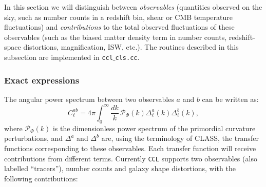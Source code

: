 \documentclass[\docopts]{\docclass}
\newcommand{\ccl}{{\tt CCL}\xspace}
\begin{document}
In this section we will distinguish between {\sl observables} (quantities observed on the sky, such as number counts in a redshift bin, shear or CMB temperature fluctuations) and {\sl contributions} to the total observed fluctuations of these observables (such as the biased matter density term in number counts, redshift-space distortions, magnification, ISW, etc.).
The routines described in this subsection are implemented in {\tt ccl$\_$cls.cc}.

\subsubsection{Exact expressions}
The angular power spectrum between two observables $a$ and $b$ can be written as:
\begin{equation}
 C^{ab}_\ell=4\pi\int_0^\infty \frac{dk}{k}\,\mathcal{P}_\Phi(k)\Delta^a_\ell(k)\Delta^b_\ell(k),
\end{equation}
where $\mathcal{P}_\Phi(k)$ is the dimensionless power spectrum of the primordial curvature perturbations, and $\Delta^a$ and $\Delta^b$ are, using the terminology of CLASS, the transfer functions corresponding to these observables. Each transfer function will receive contributions from different terms. Currently \ccl supports two observables (also labelled ``tracers''), number counts and galaxy shape distortions, with the following contributions:
\end{document}

